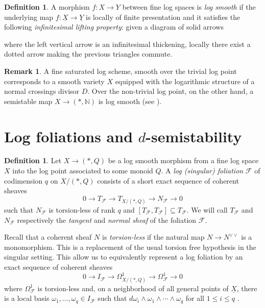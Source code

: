 \documentclass[reqno]{amsart}
\newcommand\N{\mathbb{N}}
\newcommand{\F}{\mathscr{F}}
\theoremstyle{definition}
\newtheorem{definition}[theorem]{Definition}
\newtheorem{remark}[theorem]{Remark}
\theoremstyle{named}
\begin{document}
\begin{definition}
A morphism $f: X\rightarrow Y$ between fine log spaces is \textit{log smooth} if the underlying map $f:\underline{X}\rightarrow \underline{Y}$ is locally of finite presentation and it satisfies the following \textit{infinitesimal lifting property}: given a diagram of solid arrows
\begin{center}
\end{center}
where the left vertical arrow is an infinitesimal thickening, locally there exist a dotted arrow making the previous triangles commute.
\end{definition}

\begin{remark}
    A fine saturated log scheme, smooth over the trivial log point corresponds to a smooth variety $X$ equipped with the logarithmic structure of a normal crossings divisor $D$. Over the non-trivial log point, on the other hand, a semistable map $X\to (\ast,\N)$ is log smooth (see \cite{kato1988logarithmic_str,kato1996dlog_def}).
\end{remark}

\section{Log foliations and $d$-semistability}

\begin{definition}
Let $X\rightarrow (\ast,Q)$ be a log smooth morphism from a fine log space $X$ into the log point associated to some monoid $Q$. A \textit{log (singular) foliation} $\F$ of codimension $q$ on $X/(\ast,Q)$ consists of a short exact sequence of coherent sheaves
\[
0\rightarrow T_{\F}\rightarrow T_{X/(\ast,Q)}\rightarrow N_\F\rightarrow 0
\]
such that $N_\F$ is torsion-less of rank $q$ and $[T_\F,T_\F]\subseteq T_\F$. We will call $T_{\F}$ and $N_{\F}$ respectively the \textit{tangent} and \textit{normal sheaf} of the foliation $\F$. 
\end{definition}

Recall that a coherent sheaf $N$ is \textit{torsion-less} if the natural map $N\rightarrow N^{\vee\vee}$ is a monomorphism. This is a replacement of the usual torsion free hypothesis in the singular setting. This allow us to equivalently represent a log foliation by an exact sequence of coherent sheaves
\[
0\rightarrow I_\F\rightarrow \Omega^1_{X/(\ast,Q)}\rightarrow \Omega^1_\F\rightarrow 0
\]
where $\Omega^1_\F$ is torsion-less and, on a neighborhood of all general points of $\underline{X}$, there is a local basis $\omega_1,\dots, \omega_q\in I_\F$ such that $d\omega_i \wedge \omega_1\wedge\cdots \wedge \omega_q$ for all $1\leq i\leq q$ \cite[Lemma 4.2]{Quallbrunn_2015}.
\end{document}
